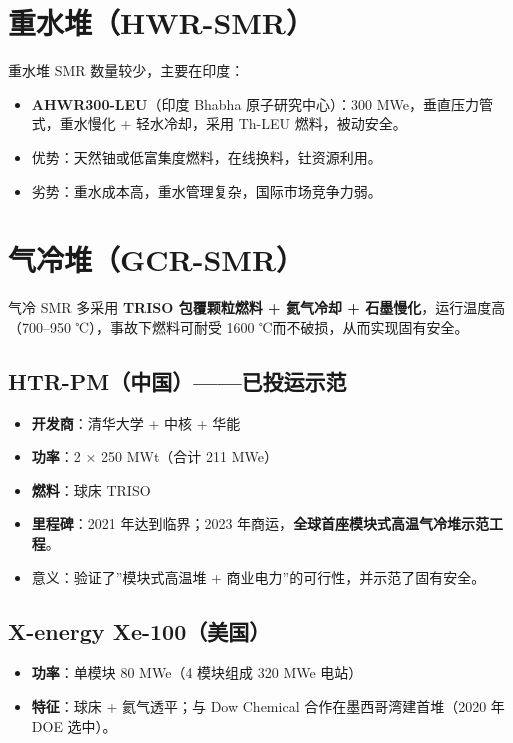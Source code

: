 \documentclass[
  UTF8,
  scheme=plain,
  fontsize=10pt,
  openany
]{ctexbook}
\begin{document}
\section{重水堆（HWR-SMR）}\label{ux91cdux6c34ux5806hwr-smr}

重水堆 SMR 数量较少，主要在印度：

\begin{itemize}
\tightlist
\item
  \textbf{AHWR300-LEU}（印度 Bhabha 原子研究中心）：300
  MWe，垂直压力管式，重水慢化 + 轻水冷却，采用 Th-LEU 燃料，被动安全。
\item
  优势：天然铀或低富集度燃料，在线换料，钍资源利用。
\item
  劣势：重水成本高，重水管理复杂，国际市场竞争力弱。
\end{itemize}

\section{气冷堆（GCR-SMR）}\label{ux6c14ux51b7ux5806gcr-smr}

气冷 SMR 多采用 \textbf{TRISO 包覆颗粒燃料 + 氦气冷却 +
石墨慢化}，运行温度高（700--950 ℃），事故下燃料可耐受 1600
℃而不破损，从而实现固有安全。

\subsection{HTR-PM（中国）------已投运示范}\label{htr-pmux4e2dux56fdux5df2ux6295ux8fd0ux793aux8303}

\begin{itemize}
\tightlist
\item
  \textbf{开发商}：清华大学 + 中核 + 华能
\item
  \textbf{功率}：2 × 250 MWt（合计 211 MWe）
\item
  \textbf{燃料}：球床 TRISO
\item
  \textbf{里程碑}：2021 年达到临界；2023
  年商运，\textbf{全球首座模块式高温气冷堆示范工程}。
\item
  意义：验证了''模块式高温堆 + 商业电力''的可行性，并示范了固有安全。
\end{itemize}

\subsection{X-energy Xe-100（美国）}\label{x-energy-xe-100ux7f8eux56fd}

\begin{itemize}
\tightlist
\item
  \textbf{功率}：单模块 80 MWe（4 模块组成 320 MWe 电站）
\item
  \textbf{特征}：球床 + 氦气透平；与 Dow Chemical
  合作在墨西哥湾建首堆（2020 年 DOE 选中）。
\end{itemize}
\end{document}
